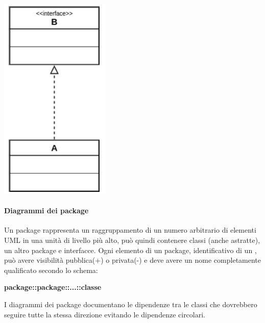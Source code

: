 \begin{itemize}
\begin{center}
\begin{minipage}{0.4\textwidth}
\begin{center}
					\end{center}
			\end{minipage}
			\begin{minipage}{0.5\textwidth}
				\begin{center}
						\includegraphics[scale=0.385]{Immagini/UML/Subtyping}\\
				\end{center}
			\end{minipage}
		\end{center}	
	\end{itemize}

\paragraph*{Diagrammi dei package}
Un package rappresenta un raggruppamento di un numero arbitrario di elementi UML in una unità di livello più alto, può quindi contenere classi (anche astratte), un altro package e interfacce. Ogni elemento di un package, identificativo di un , può avere visibilità pubblica(+) o privata(-) e deve avere un nome completamente qualificato secondo lo schema: 
\begin{center}
	\textbf{package::package::...::classe}
\end{center}
I diagrammi dei package documentano le dipendenze tra le classi che dovrebbero seguire tutte la stessa direzione evitando le dipendenze circolari.

